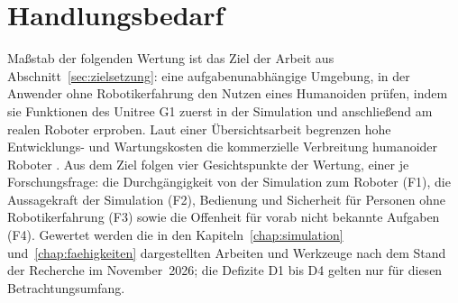 \section{Handlungsbedarf}
\label{sec:handlungsbedarf}
Maßstab der folgenden Wertung ist das Ziel der Arbeit aus Abschnitt~\ref{sec:zielsetzung}: eine aufgabenunabhängige Umgebung, in der Anwender ohne Robotikerfahrung den Nutzen eines Humanoiden prüfen, indem sie Funktionen des Unitree G1 zuerst in der Simulation und anschließend am realen Roboter erproben.
Laut einer Übersichtsarbeit begrenzen hohe Entwicklungs- und Wartungskosten die kommerzielle Verbreitung humanoider Roboter \cite{Tong2024}.
Aus dem Ziel folgen vier Gesichtspunkte der Wertung, einer je Forschungsfrage: die Durchgängigkeit von der Simulation zum Roboter (F1), die Aussagekraft der Simulation (F2), Bedienung und Sicherheit für Personen ohne Robotikerfahrung (F3) sowie die Offenheit für vorab nicht bekannte Aufgaben (F4).
Gewertet werden die in den Kapiteln~\ref{chap:simulation} und~\ref{chap:faehigkeiten} dargestellten Arbeiten und Werkzeuge nach dem Stand der Recherche im November~2026; die Defizite D1 bis D4 gelten nur für diesen Betrachtungsumfang.

